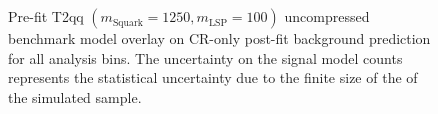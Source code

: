 \begin{figure}[h!]
\begin{center}
{            \label{fig:T2qq_8fold_uncompressed_MR_4j}
        } \\
         ~~
         \\
        \caption{
            Pre-fit T2qq $(m_{\mathrm{Squark}}=1250, m_{\mathrm{LSP}}=100)$
            uncompressed benchmark model overlay on CR-only post-fit background
            prediction for all analysis bins. The uncertainty on the signal
            model counts represents the statistical uncertainty due to the
            finite size of the of the simulated sample.
        }
        \label{fig:T2qq_8fold_uncompressed_MR}
    \end{center}
\end{figure}

